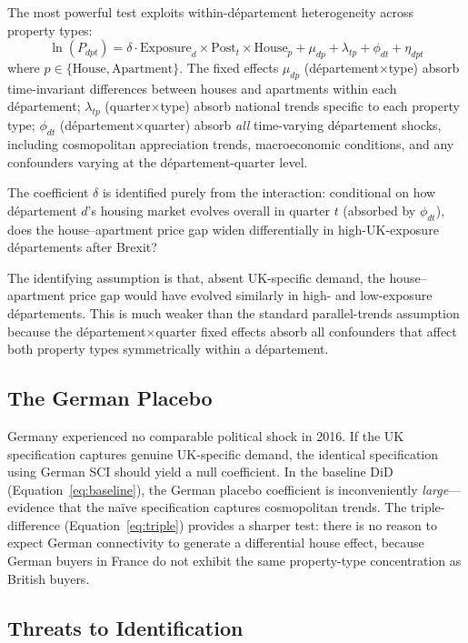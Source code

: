 \documentclass[12pt]{article}
\begin{document}
The most powerful test exploits within-d\'epartement heterogeneity across property types:
\begin{equation}\label{eq:triple}
\ln(P_{dpt}) = \delta \cdot \text{Exposure}_d \times \text{Post}_t \times \text{House}_p + \mu_{dp} + \lambda_{tp} + \phi_{dt} + \eta_{dpt}
\end{equation}
where $p \in \{\text{House}, \text{Apartment}\}$. The fixed effects $\mu_{dp}$ (d\'epartement$\times$type) absorb time-invariant differences between houses and apartments within each d\'epartement; $\lambda_{tp}$ (quarter$\times$type) absorb national trends specific to each property type; $\phi_{dt}$ (d\'epartement$\times$quarter) absorb \textit{all} time-varying d\'epartement shocks, including cosmopolitan appreciation trends, macroeconomic conditions, and any confounders varying at the d\'epartement-quarter level.

The coefficient $\delta$ is identified purely from the interaction: conditional on how d\'epartement $d$'s housing market evolves overall in quarter $t$ (absorbed by $\phi_{dt}$), does the house--apartment price gap widen differentially in high-UK-exposure d\'epartements after Brexit?

The identifying assumption is that, absent UK-specific demand, the house--apartment price gap would have evolved similarly in high- and low-exposure d\'epartements. This is much weaker than the standard parallel-trends assumption because the d\'epartement$\times$quarter fixed effects absorb all confounders that affect both property types symmetrically within a d\'epartement.

\subsection{The German Placebo}

Germany experienced no comparable political shock in 2016. If the UK specification captures genuine UK-specific demand, the identical specification using German SCI should yield a null coefficient. In the baseline DiD (Equation~\ref{eq:baseline}), the German placebo coefficient is inconveniently \textit{large}---evidence that the na\"ive specification captures cosmopolitan trends. The triple-difference (Equation~\ref{eq:triple}) provides a sharper test: there is no reason to expect German connectivity to generate a differential house effect, because German buyers in France do not exhibit the same property-type concentration as British buyers.

\subsection{Threats to Identification}
\end{document}
